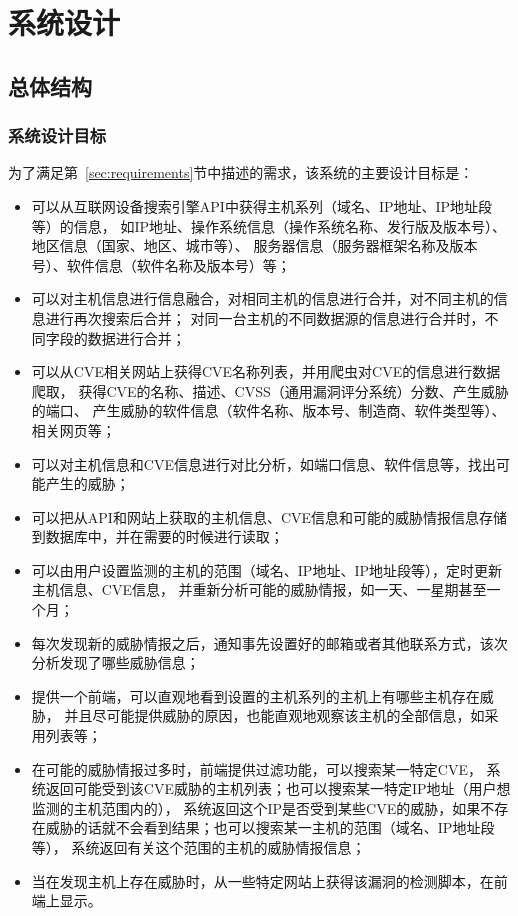 \chapter{系统设计}
\label{cha:design}

\section{总体结构}
\label{chap3:structure}

\subsection{系统设计目标}
\label{sec:goal}

为了满足第~\ref{sec:requirements}节中描述的需求，该系统的主要设计目标是：

\begin{itemize}
    \item 可以从互联网设备搜索引擎API中获得主机系列（域名、IP地址、IP地址段等）的信息，
    如IP地址、操作系统信息（操作系统名称、发行版及版本号）、地区信息（国家、地区、城市等）、
    服务器信息（服务器框架名称及版本号）、软件信息（软件名称及版本号）等；
    \item 可以对主机信息进行信息融合，对相同主机的信息进行合并，对不同主机的信息进行再次搜索后合并；
    对同一台主机的不同数据源的信息进行合并时，不同字段的数据进行合并；
    \item 可以从CVE相关网站上获得CVE名称列表，并用爬虫对CVE的信息进行数据爬取，
    获得CVE的名称、描述、CVSS（通用漏洞评分系统）分数、产生威胁的端口、
    产生威胁的软件信息（软件名称、版本号、制造商、软件类型等）、相关网页等；
    \item 可以对主机信息和CVE信息进行对比分析，如端口信息、软件信息等，找出可能产生的威胁；
    \item 可以把从API和网站上获取的主机信息、CVE信息和可能的威胁情报信息存储到数据库中，并在需要的时候进行读取；
    \item 可以由用户设置监测的主机的范围（域名、IP地址、IP地址段等），定时更新主机信息、CVE信息，
    并重新分析可能的威胁情报，如一天、一星期甚至一个月；
    \item 每次发现新的威胁情报之后，通知事先设置好的邮箱或者其他联系方式，该次分析发现了哪些威胁信息；
    \item 提供一个前端，可以直观地看到设置的主机系列的主机上有哪些主机存在威胁，
    并且尽可能提供威胁的原因，也能直观地观察该主机的全部信息，如采用列表等；
    \item 在可能的威胁情报过多时，前端提供过滤功能，可以搜索某一特定CVE，
    系统返回可能受到该CVE威胁的主机列表；也可以搜索某一特定IP地址（用户想监测的主机范围内的），
    系统返回这个IP是否受到某些CVE的威胁，如果不存在威胁的话就不会看到结果；也可以搜索某一主机的范围（域名、IP地址段等），
    系统返回有关这个范围的主机的威胁情报信息；
    \item 当在发现主机上存在威胁时，从一些特定网站上获得该漏洞的检测脚本，在前端上显示。
\end{itemize}

